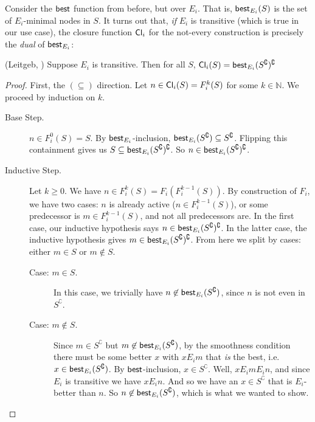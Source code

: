 \documentclass[letterpaper]{article}
\begin{document}
    Consider the $\mathsf{best}$ function from before, but over $E_i$.  That is, $\mathsf{best}_{E_i}(S)$ is the set of $E_i$-minimal nodes in $S$.  It turns out that, \emph{if} $E_i$ is transitive (which is true in our use case), the closure function $\mathsf{Cl}_i$ for the not-every construction is precisely the \emph{dual} of $\mathsf{best}_{E_i}$:
    \begin{claim*} (Leitgeb, \cite{leitgeb2001nonmonotonic})
        Suppose $E_i$ is transitive.  Then for all $S$, $\mathsf{Cl}_i(S) = \mathsf{best}_{E_i}(S^\complement)^\complement$
    \end{claim*}
    \begin{proof}
        First, the $(\subseteq)$ direction.  Let $n \in \mathsf{Cl}_i(S) = F^k_i(S)$ for some $k \in \mathbb{N}$.  We proceed by induction on $k$.
        \begin{description}
            \item[Base Step.] $n \in F^0_i(S) = S$.  By $\mathsf{best}_{E_i}$-inclusion, $\mathsf{best}_{E_i}(S^\complement) \subseteq S^\complement$. Flipping this containment gives us $S \subseteq \mathsf{best}_{E_i}(S^\complement)^\complement$.  So $n \in \mathsf{best}_{E_i}(S^\complement)^\complement$.
            
            \item[Inductive Step.] Let $k \geq 0$.  We have $n \in F^k_i(S) = F_i(F^{k-1}_i(S))$.  By construction of $F_i$, we have two cases: $n$ is already active ($n \in F^{k-1}_i(S)$), or some predecessor is $m \in F^{k-1}_i(S)$, and not all predecessors are.  In the first case, our inductive hypothesis says $n \in \mathsf{best}_{E_i}(S^\complement)^\complement$.  In the latter case, the inductive hypothesis gives $m \in \mathsf{best}_{E_i}(S^\complement)^\complement$.  From here we split by cases: either $m \in S$ or $m \not \in S$.
            \begin{description}
                \item[Case: $m \in S$.] In this case, we trivially have $n \not \in \mathsf{best}_{E_i}(S^\complement)$, since $n$ is not even in $S^\complement$.

                \item[Case: $m \not \in S$.]
                Since $m \in S^\complement$ but $m \not \in \mathsf{best}_{E_i}(S^\complement)$, by the smoothness condition there must be some better $x$ with $x{E_i}m$ that \emph{is} the best, i.e. $x \in \mathsf{best}_{E_i}(S^\complement)$.  By $\mathsf{best}$-inclusion, $x \in S^\complement$.  Well, $x{E_i}m{E_i}n$, and since $E_i$ is transitive we have $x{E_i}n$.  And so we have an $x \in S^\complement$ that is $E_i$-better than $n$.  So $n \not \in \mathsf{best}_{E_i}(S^\complement)$, which is what we wanted to show.
            \end{description}
        \end{description}


\end{proof}
\end{document}
